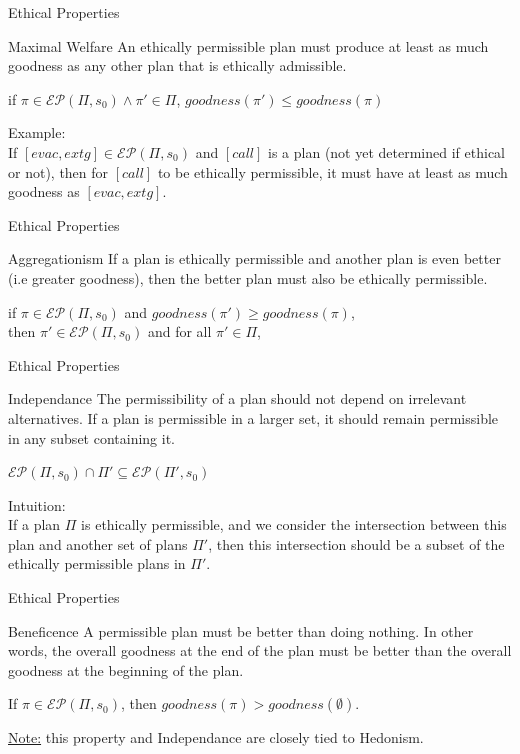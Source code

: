 \documentclass[compress,xcolor=table]{beamer}
\begin{document}
\begin{frame}{Ethical Properties}
    \begin{block}{Maximal Welfare}
        An ethically permissible plan must produce at least as much goodness as any other plan that is ethically admissible.
    \end{block}
    if $\pi \in \mathcal{EP}(\Pi, s_0) \wedge \pi' \in \Pi$,  $goodness(\pi') \leq goodness(\pi)$

    Example: \\
    If $[evac,extg] \in \mathcal{EP}(\Pi, s_0)$ and $[call]$ is a plan (not yet determined if ethical or not), 
    then for $[call]$ to be ethically permissible, it must have at least as much goodness as $[evac,extg]$.
\end{frame}

\begin{frame}{Ethical Properties}
    \begin{block}{Aggregationism}
        If a plan is ethically permissible and another plan is even better (i.e greater goodness), 
        then the better plan must also be ethically permissible.
    \end{block}
    if $\pi \in \mathcal{EP}(\Pi, s_0)$ and $goodness(\pi') \geq goodness(\pi)$, \\
    then $\pi' \in \mathcal{EP}(\Pi, s_0)$ and for all $\pi' \in \Pi$,
\end{frame}

\begin{frame}{Ethical Properties}
    \begin{block}{Independance}
        The permissibility of a plan should not depend on irrelevant alternatives. 
        If a plan is permissible in a larger set, 
        it should remain permissible in any subset containing it.       
    \end{block}
    $\mathcal{EP}(\Pi, s_0) \cap \Pi' \subseteq \mathcal{EP}(\Pi', s_0)$

    Intuition:\\
    If a plan $\Pi$ is ethically permissible, and we consider the intersection between this plan and another set of plans $\Pi'$, 
    then this intersection should be a subset of the ethically permissible plans in $\Pi'$.
\end{frame}

\begin{frame}{Ethical Properties}
    \begin{block}{Beneficence}
        A permissible plan must be better than doing nothing. 
        In other words, the overall goodness at the end of the plan
        must be better than the overall goodness at the beginning of the plan.
    \end{block}
    If $\pi \in \mathcal{EP}(\Pi, s_0)$, then $goodness(\pi) > goodness(\emptyset)$.

    \vfill

    \tiny
    \underline{Note:} this property and Independance are closely tied to Hedonism. 
\end{frame}
\end{document}
